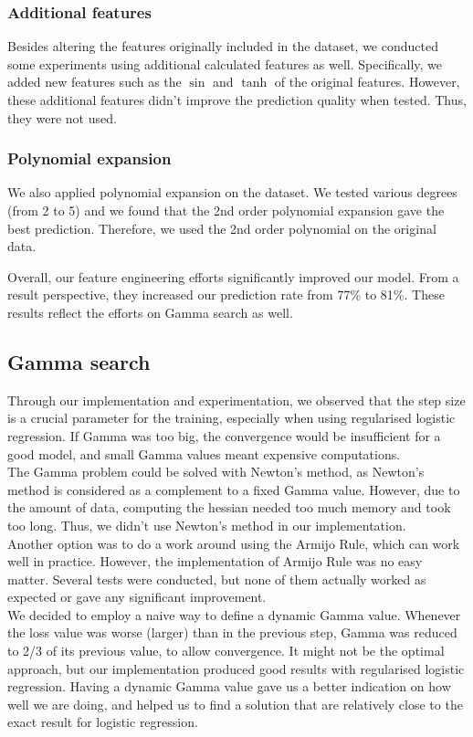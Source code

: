 \documentclass[10pt,conference,compsocconf]{IEEEtran}
\begin{document}
\subsubsection{Additional features}
Besides altering the features originally included in the dataset, we conducted some experiments using additional calculated features as well. Specifically, we added new features such as the $\sin$ and $\tanh$ of the original features. However, these additional features didn't improve the prediction quality when tested. Thus, they were not used.

\subsubsection{Polynomial expansion}
We also applied polynomial expansion on the dataset. We tested various degrees (from 2 to 5) and we found that the 2nd order polynomial expansion gave the best prediction. Therefore, we used the 2nd order polynomial on the original data.

Overall, our feature engineering efforts significantly improved our model. From a result perspective, they increased our prediction rate from 77\% to 81\%. These results reflect the efforts on Gamma search as well.

\subsection{Gamma search}

Through our implementation and experimentation, we observed that the step size is a crucial parameter for the training, especially when using regularised logistic regression. If Gamma was too big, the convergence would be insufficient for a good model, and small Gamma values meant expensive computations. \\
The Gamma problem could be solved with Newton’s method, as Newton’s method is considered as a complement to a fixed Gamma value. However, due to the amount of data, computing the hessian needed too much memory and took too long. Thus, we didn't use Newton’s method in our implementation. \\
Another option was to do a work around using the Armijo Rule, which can work well in practice. However, the implementation of Armijo Rule was no easy matter. Several tests were conducted, but none of them actually worked as expected or gave any significant improvement. \\
We decided to employ a naive way to define a dynamic Gamma value. Whenever the loss value was worse (larger) than in the previous step, Gamma was reduced to 2/3 of its previous value, to allow convergence. It might not be the optimal approach, but our implementation produced good results with regularised logistic regression.
Having a dynamic Gamma value gave us a better indication on how well we are doing, and helped us to find a solution that are relatively close to the exact result for logistic regression.
\end{document}
